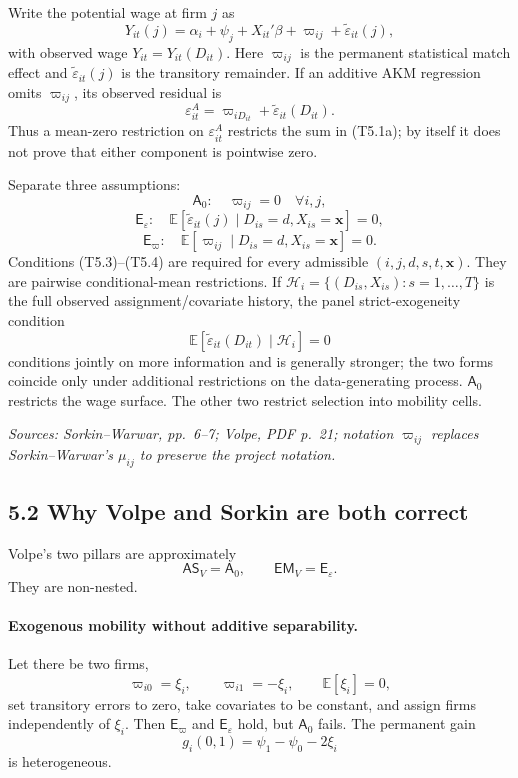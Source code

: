 \documentclass[11pt]{article}
\begin{document}
Write the potential wage at firm \(j\) as
\[
Y_{it}(j)
=
\alpha_i+\psi_j+X_{it}'\beta
+\varpi_{ij}
+\widetilde\varepsilon_{it}(j),
\tag{T5.1}
\]
with observed wage \(Y_{it}=Y_{it}(D_{it})\).  Here \(\varpi_{ij}\) is the
permanent statistical match effect and
\(\widetilde\varepsilon_{it}(j)\) is the transitory remainder.
If an additive AKM regression omits \(\varpi_{ij}\), its observed residual is
\[
\varepsilon_{it}^A
=
\varpi_{iD_{it}}
+\widetilde\varepsilon_{it}(D_{it}).
\tag{T5.1a}
\]
Thus a mean-zero restriction on \(\varepsilon_{it}^A\) restricts the sum in
(T5.1a); by itself it does not prove that either component is pointwise zero.

Separate three assumptions:
\[
\mathsf A_0:
\quad
\varpi_{ij}=0\quad\forall i,j,
\tag{T5.2}
\]
\[
\mathsf E_\varepsilon:
\quad
\mathbb E[
\widetilde\varepsilon_{it}(j)
\mid D_{is}=d,X_{is}=\mathbf x]=0,
\tag{T5.3}
\]
\[
\mathsf E_\varpi:
\quad
\mathbb E[
\varpi_{ij}
\mid D_{is}=d,X_{is}=\mathbf x]=0.
\tag{T5.4}
\]
Conditions (T5.3)--(T5.4) are required for every admissible
\((i,j,d,s,t,\mathbf x)\).  They are pairwise conditional-mean restrictions.  If
\(\mathcal H_i=\{(D_{is},X_{is}):s=1,\ldots,T\}\) is the full observed
assignment/covariate history, the panel strict-exogeneity condition
\[
\mathbb E[
\widetilde\varepsilon_{it}(D_{it})\mid\mathcal H_i]=0
\tag{T5.4a}
\]
conditions jointly on more information and is generally stronger; the two
forms coincide only under additional restrictions on the data-generating
process.
\(\mathsf A_0\) restricts the wage surface.  The other two restrict selection
into mobility cells.

\textit{Sources: Sorkin--Warwar, pp.\ 6--7; Volpe, PDF p.\ 21; notation
\(\varpi_{ij}\) replaces Sorkin--Warwar's \(\mu_{ij}\) to preserve the
project notation.}

\subsection{5.2 Why Volpe and Sorkin are both correct}

Volpe's two pillars are approximately
\[
\mathsf{AS}_{V}=\mathsf A_0,
\qquad
\mathsf{EM}_{V}=\mathsf E_\varepsilon.
\tag{T5.5}
\]
They are non-nested.

\paragraph{Exogenous mobility without additive separability.}
Let there be two firms,
\[
\varpi_{i0}=\xi_i,
\qquad
\varpi_{i1}=-\xi_i,
\qquad
\mathbb E[\xi_i]=0,
\tag{T5.6}
\]
set transitory errors to zero, take covariates to be constant, and assign
firms independently of \(\xi_i\).
Then \(\mathsf E_\varpi\) and \(\mathsf E_\varepsilon\) hold, but
\(\mathsf A_0\) fails.  The permanent gain
\[
g_i(0,1)=\psi_1-\psi_0-2\xi_i
\tag{T5.7}
\]
is heterogeneous.
\end{document}
